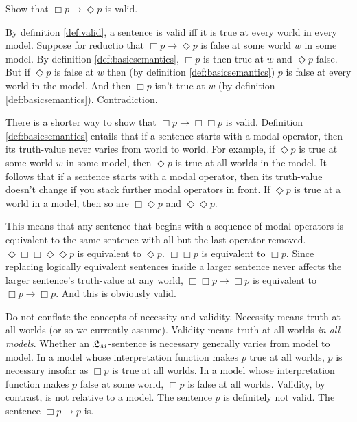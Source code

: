 \begin{exercise}
  Show that $\Box p \to \Diamond p$ is valid. 
\end{exercise}
\begin{solution}
  By definition \ref{def:valid}, a sentence is valid iff it is true at every
  world in every model. Suppose for reductio that $\Box p \to \Diamond p$ is
  false at some world $w$ in some model. By definition \ref{def:basicsemantics},
  $\Box p$ is then true at $w$ and $\Diamond p$ false. But if $\Diamond p$ is
  false at $w$ then (by definition \ref{def:basicsemantics}) $p$ is false at
  every world in the model. And then $\Box p$ isn't true at $w$ (by definition
  \ref{def:basicsemantics}). Contradiction.
\end{solution}

There is a shorter way to show that $\Box p \to \Box\Box p$ is valid. Definition
\ref{def:basicsemantics} entails that if a sentence starts with a modal
operator, then its truth-value never varies from world to world. For example, if
$\Diamond p$ is true at some world $w$ in some model, then $\Diamond p$ is true
at all worlds in the model. It follows that if a sentence starts with a modal
operator, then its truth-value doesn't change if you stack further modal
operators in front. If $\Diamond p$ is true at a world in a model, then so
are $\Box\Diamond p$ and $\Diamond \Diamond p$.

This means that any sentence that begins with a sequence of modal operators is
equivalent to the same sentence with all but the last operator removed.
$\Diamond\Box\Box\Diamond\Diamond p$ is equivalent to $\Diamond p$. $\Box\Box p$
is equivalent to $\Box p$. Since replacing logically equivalent sentences inside
a larger sentence never affects the larger sentence's truth-value at any world,
$\Box\Box p \to \Box p$ is equivalent to $\Box p \to \Box p$. And this is
obviously valid.

Do not conflate the concepts of necessity and validity. Necessity means truth at
all worlds (or so we currently assume). Validity means truth at all worlds
\emph{in all models}. Whether an $\mathfrak{L}_M$-sentence is necessary generally varies
from model to model. In a model whose interpretation function makes $p$ true at
all worlds, $p$ is necessary insofar as $\Box p$ is true at all worlds. In a
model whose interpretation function makes $p$ false at some world, $\Box p$ is
false at all worlds. Validity, by contrast, is not relative to a model. The
sentence $p$ is definitely not valid. The sentence $\Box p \to p$ is.

